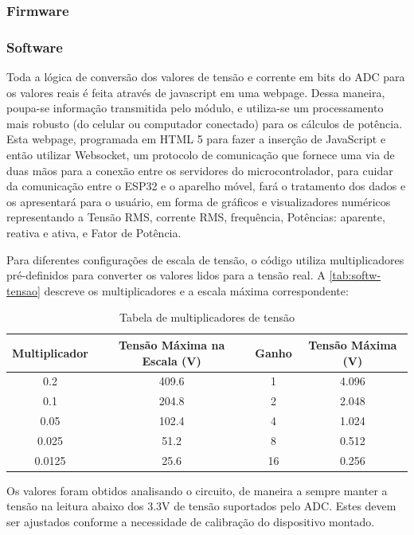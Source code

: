 \subsubsection{Firmware}\label{firmw}


\subsubsection{Software}\label{softwa}

Toda a lógica de conversão dos valores de tensão e corrente em bits do \gls{ADC} para os valores reais é feita através de javascript em uma webpage. Dessa maneira, poupa-se informação transmitida pelo módulo, e utiliza-se um processamento mais robusto (do celular ou computador conectado) para os cálculos de potência.
Esta webpage, programada em HTML 5 para fazer a inserção de JavaScript e então utilizar Websocket, um protocolo de comunicação que fornece uma via de duas mãos para a conexão entre os servidores do microcontrolador, para cuidar da comunicação entre o ESP32 e o aparelho móvel, fará o tratamento dos dados e os apresentará para o usuário, em forma de gráficos e visualizadores numéricos representando a Tensão RMS, corrente RMS, frequência, Potências: aparente, reativa e ativa, e Fator de Potência.

Para diferentes configurações de escala de tensão, o código utiliza multiplicadores pré-definidos para converter os valores lidos para a tensão real. A \autoref{tab:softw-tensao} descreve os multiplicadores e a escala máxima correspondente:

\begin{table}[h!]
    \centering
    \begin{tabular}{|c|c|c|c|}
    \hline
    \textbf{Multiplicador} & \textbf{Tensão Máxima na Escala (V)} & \textbf{Ganho} & \textbf{Tensão Máxima (V)} \\
    \hline
    0.2 & 409.6 & 1 & 4.096 \\
    0.1 & 204.8 & 2 & 2.048 \\
    0.05 & 102.4 & 4 & 1.024 \\
    0.025 & 51.2 & 8 & 0.512 \\
    0.0125 & 25.6 & 16 & 0.256 \\
    \hline
    \end{tabular}
    \caption{Tabela de multiplicadores de tensão}
    \label{tab:softw-tensao}
\end{table}

Os valores foram obtidos analisando o circuito, de maneira a sempre manter a tensão na leitura abaixo dos 3.3V de tensão suportados pelo \gls{ADC}. Estes devem ser ajustados conforme a necessidade de calibração do dispositivo montado.

